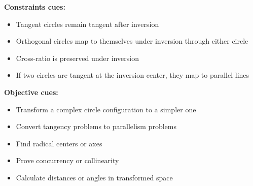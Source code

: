 \documentclass[12pt]{article}
\begin{document}
\textbf{Constraints cues:}
\begin{itemize}
    \item Tangent circles remain tangent after inversion
    \item Orthogonal circles map to themselves under inversion through either circle
    \item Cross-ratio is preserved under inversion
    \item If two circles are tangent at the inversion center, they map to parallel lines
\end{itemize}

\textbf{Objective cues:}
\begin{itemize}
    \item Transform a complex circle configuration to a simpler one
    \item Convert tangency problems to parallelism problems
    \item Find radical centers or axes
    \item Prove concurrency or collinearity
    \item Calculate distances or angles in transformed space
\end{itemize}
\end{document}
